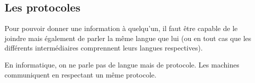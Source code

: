 \subsection{Les protocoles}
Pour pouvoir donner une information à quelqu'un, il faut être capable de le joindre mais également de parler la même langue que lui (ou en tout cas que les différents intermédiaires comprennent leurs langues respectives).

En informatique, on ne parle pas de langue mais de protocole. Les machines communiquent en respectant un même protocole.

